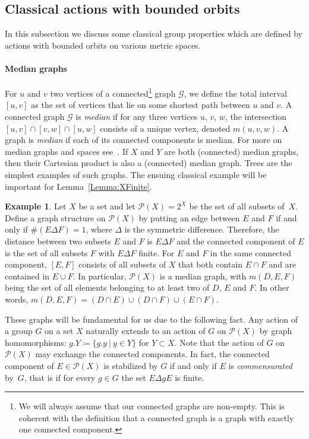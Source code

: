 \documentclass[a4paper]{article}
\theoremstyle{definition}
\newtheorem{exmp}[lem]{Example}
\newcommand{\setst}[2]{\{#1\ |\ #2\}}
\newcommand*{\powerset}[1]{\mathcal P(#1)}
\begin{document}
\subsection{Classical actions with bounded orbits}
%
%
%
In this subsection we discuss some classical group properties which are defined by actions with bounded orbits on various metric spaces.

\paragraph{Median graphs}
For $u$ and $v$ two vertices of a connected\footnote{We will always assume that our connected graphs are non-empty. This is coherent with the definition that a connected graph is a graph with exactly one connected component.} graph $\mathcal G$, we define the total interval $[u,v]$ as the set of vertices that lie on some shortest path between $u$ and $v$.
A connected graph $\mathcal G$ is \emph{median} if for any three vertices $u$, $v$, $w$, the intersection $[u,v]\cap[v,w]\cap[u,w]$ consists of a unique vertex, denoted $m(u,v,w)$.
A graph is \emph{median} if each of its connected components is median. For more on median graphs and spaces see~\cite{MR2405677,MR2671183,MR1705337}.
If $X$ and $Y$ are both (connected) median graphs, then their Cartesian product is also a (connected) median graph.
Trees are the simplest examples of such graphs.
The ensuing classical example will be important for Lemma~\ref{Lemma:XFinite}.
%
%
\begin{exmp}\label{Ex:MainMedian}
Let $X$ be a set and let  $\powerset{X}=2^X$ be the set of all subsets of~$X$.
Define a graph structure on $\powerset{X}$ by putting an edge between $E$ and $F$ if and only if $\#(E\Delta F)=1$, where $\Delta$ is the symmetric difference.
Therefore, the distance between two subsets $E$ and $F$ is $E\Delta F$ and
the connected component of $E$ is the set of all subsets $F$ with $E\Delta F$ finite.
For $E$ and $F$ in the same connected component, $[E,F]$ consists of all subsets of $X$ that both contain $E\cap F$ and are contained in $E\cup F$.
In particular, $\powerset{X}$ is a median graph, with $m(D,E,F)$ being the set of all elements belonging to at least two of $D$, $E$ and $F$. In other words, $m(D,E,F)=(D\cap E)\cup(D\cap F)\cup(E\cap F)$.
\end{exmp}
%
%

These graphs will be fundamental for us due to the following fact.
Any action of a group $G$ on a set $X$ naturally extends to an action of $G$ on $\powerset{X}$ by graph homomorphisms: $g.Y\coloneqq\setst{g.y}{y\in Y}$ for $Y\subset X$.
Note that the action of $G$ on $\powerset{X}$ may exchange the connected components.
In fact, the connected component of $E\in \powerset{X}$ is stabilized by $G$ if and only if $E$ is \emph{commensurated} by~$G$, that is if for every $g\in G$ the set $E\Delta gE$ is finite.
%
%
%
%
\end{document}
